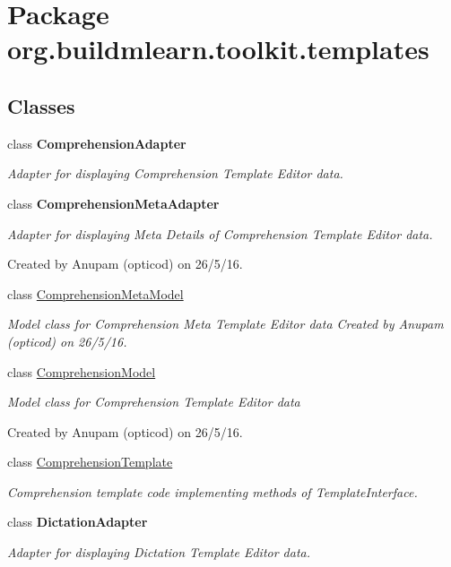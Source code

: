 \hypertarget{namespaceorg_1_1buildmlearn_1_1toolkit_1_1templates}{}\section{Package org.\+buildmlearn.\+toolkit.\+templates}
\label{namespaceorg_1_1buildmlearn_1_1toolkit_1_1templates}
\subsection*{Classes}
\begin{DoxyCompactItemize}
\item 
class {\bfseries Comprehension\+Adapter}
\begin{DoxyCompactList}\small\item\em Adapter for displaying Comprehension Template Editor data. \end{DoxyCompactList}\item 
class {\bfseries Comprehension\+Meta\+Adapter}
\begin{DoxyCompactList}\small\item\em Adapter for displaying Meta Details of Comprehension Template Editor data. 

Created by Anupam (opticod) on 26/5/16. \end{DoxyCompactList}\item 
class \hyperlink{classorg_1_1buildmlearn_1_1toolkit_1_1templates_1_1ComprehensionMetaModel}{Comprehension\+Meta\+Model}
\begin{DoxyCompactList}\small\item\em Model class for Comprehension Meta Template Editor data Created by Anupam (opticod) on 26/5/16. \end{DoxyCompactList}\item 
class \hyperlink{classorg_1_1buildmlearn_1_1toolkit_1_1templates_1_1ComprehensionModel}{Comprehension\+Model}
\begin{DoxyCompactList}\small\item\em Model class for Comprehension Template Editor data 

Created by Anupam (opticod) on 26/5/16. \end{DoxyCompactList}\item 
class \hyperlink{classorg_1_1buildmlearn_1_1toolkit_1_1templates_1_1ComprehensionTemplate}{Comprehension\+Template}
\begin{DoxyCompactList}\small\item\em Comprehension template code implementing methods of Template\+Interface. \end{DoxyCompactList}\item 
class {\bfseries Dictation\+Adapter}
\begin{DoxyCompactList}\small\item\em Adapter for displaying Dictation Template Editor data. 


\end{DoxyCompactList}
\end{DoxyCompactItemize}

